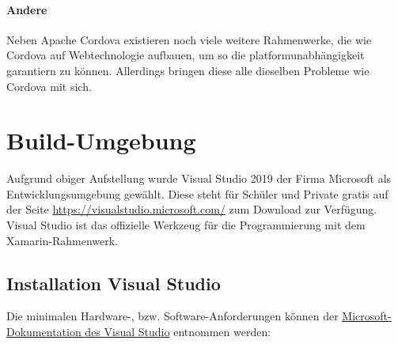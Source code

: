 \paragraph{Andere}
Neben Apache Cordova existieren noch viele weitere Rahmenwerke, die wie Cordova auf Webtechnologie aufbauen, um so die platformunabhängigkeit garantiern zu können. Allerdings bringen diese alle dieselben Probleme wie Cordova mit sich.

\section{Build-Umgebung}
Aufgrund obiger Aufstellung wurde Visual Studio 2019 der Firma Microsoft als Entwicklungsumgebung gewählt.
Diese steht für Schüler und Private gratis auf der Seite \href{https://visualstudio.microsoft.com/}{https://visualstudio.microsoft.com/} zum Download zur Verfügung.
Visual Studio ist das offizielle Werkzeug für die Programmierung mit dem Xamarin-Rahmenwerk.

%
\subsection{Installation Visual Studio} %
Die minimalen Hardware-, bzw. Software-Anforderungen können der \href{https://docs.microsoft.com/en-us/visualstudio/releases/2019/system-requirements}{Microsoft-Doku\-men\-tation des Visual Studio} entnommen werden:

